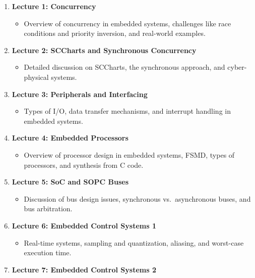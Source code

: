 \documentclass[
  14pt,
  a4paper,
  DIV=11,
  numbers=noendperiod,
  headinclude=true,
  footinclude=true]{scrreprt}
\providecommand{\tightlist}{%
  \setlength{\itemsep}{0pt}\setlength{\parskip}{0pt}}\usepackage{longtable,booktabs,array}
\begin{document}
\begin{enumerate}
\def\labelenumi{\arabic{enumi}.}
\tightlist
\item
  \textbf{Lecture 1: Concurrency}

  \begin{itemize}
  \tightlist
  \item
    Overview of concurrency in embedded systems, challenges like race
    conditions and priority inversion, and real-world examples.
  \end{itemize}
\item
  \textbf{Lecture 2: SCCharts and Synchronous Concurrency}

  \begin{itemize}
  \tightlist
  \item
    Detailed discussion on SCCharts, the synchronous approach, and
    cyber-physical systems.
  \end{itemize}
\item
  \textbf{Lecture 3: Peripherals and Interfacing}

  \begin{itemize}
  \tightlist
  \item
    Types of I/O, data transfer mechanisms, and interrupt handling in
    embedded systems.
  \end{itemize}
\item
  \textbf{Lecture 4: Embedded Processors}

  \begin{itemize}
  \tightlist
  \item
    Overview of processor design in embedded systems, FSMD, types of
    processors, and synthesis from C code.
  \end{itemize}
\item
  \textbf{Lecture 5: SoC and SOPC Buses}

  \begin{itemize}
  \tightlist
  \item
    Discussion of bus design issues, synchronous vs.~asynchronous buses,
    and bus arbitration.
  \end{itemize}
\item
  \textbf{Lecture 6: Embedded Control Systems 1}

  \begin{itemize}
  \tightlist
  \item
    Real-time systems, sampling and quantization, aliasing, and
    worst-case execution time.
  \end{itemize}
\item
  \textbf{Lecture 7: Embedded Control Systems 2}


\end{enumerate}
\end{document}
